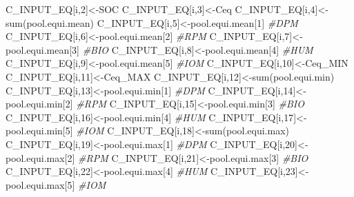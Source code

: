 \documentclass[
  10pt,
  b5paper,
]{book}
\newenvironment{Shaded}{\begin{snugshade}}{\end{snugshade}}
\newcommand{\CommentTok}[1]{\textcolor[rgb]{0.56,0.35,0.01}{\textit{#1}}}
\newcommand{\DecValTok}[1]{\textcolor[rgb]{0.00,0.00,0.81}{#1}}
\newcommand{\FunctionTok}[1]{\textcolor[rgb]{0.00,0.00,0.00}{#1}}
\newcommand{\NormalTok}[1]{#1}
\newcommand{\OtherTok}[1]{\textcolor[rgb]{0.56,0.35,0.01}{#1}}
\begin{document}
\begin{Shaded}
\begin{Highlighting}[]
\NormalTok{      C\_INPUT\_EQ[i,}\DecValTok{2}\NormalTok{]}\OtherTok{\textless{}{-}}\NormalTok{SOC}
\NormalTok{      C\_INPUT\_EQ[i,}\DecValTok{3}\NormalTok{]}\OtherTok{\textless{}{-}}\NormalTok{Ceq}
\NormalTok{      C\_INPUT\_EQ[i,}\DecValTok{4}\NormalTok{]}\OtherTok{\textless{}{-}}\FunctionTok{sum}\NormalTok{(pool.equi.mean)}
\NormalTok{      C\_INPUT\_EQ[i,}\DecValTok{5}\NormalTok{]}\OtherTok{\textless{}{-}}\NormalTok{pool.equi.mean[}\DecValTok{1}\NormalTok{] }\CommentTok{\#DPM}
\NormalTok{      C\_INPUT\_EQ[i,}\DecValTok{6}\NormalTok{]}\OtherTok{\textless{}{-}}\NormalTok{pool.equi.mean[}\DecValTok{2}\NormalTok{] }\CommentTok{\#RPM}
\NormalTok{      C\_INPUT\_EQ[i,}\DecValTok{7}\NormalTok{]}\OtherTok{\textless{}{-}}\NormalTok{pool.equi.mean[}\DecValTok{3}\NormalTok{] }\CommentTok{\#BIO}
\NormalTok{      C\_INPUT\_EQ[i,}\DecValTok{8}\NormalTok{]}\OtherTok{\textless{}{-}}\NormalTok{pool.equi.mean[}\DecValTok{4}\NormalTok{] }\CommentTok{\#HUM}
\NormalTok{      C\_INPUT\_EQ[i,}\DecValTok{9}\NormalTok{]}\OtherTok{\textless{}{-}}\NormalTok{pool.equi.mean[}\DecValTok{5}\NormalTok{] }\CommentTok{\#IOM}
\NormalTok{      C\_INPUT\_EQ[i,}\DecValTok{10}\NormalTok{]}\OtherTok{\textless{}{-}}\NormalTok{Ceq\_MIN}
\NormalTok{      C\_INPUT\_EQ[i,}\DecValTok{11}\NormalTok{]}\OtherTok{\textless{}{-}}\NormalTok{Ceq\_MAX}
\NormalTok{      C\_INPUT\_EQ[i,}\DecValTok{12}\NormalTok{]}\OtherTok{\textless{}{-}}\FunctionTok{sum}\NormalTok{(pool.equi.min)}
\NormalTok{      C\_INPUT\_EQ[i,}\DecValTok{13}\NormalTok{]}\OtherTok{\textless{}{-}}\NormalTok{pool.equi.min[}\DecValTok{1}\NormalTok{] }\CommentTok{\#DPM}
\NormalTok{      C\_INPUT\_EQ[i,}\DecValTok{14}\NormalTok{]}\OtherTok{\textless{}{-}}\NormalTok{pool.equi.min[}\DecValTok{2}\NormalTok{] }\CommentTok{\#RPM}
\NormalTok{      C\_INPUT\_EQ[i,}\DecValTok{15}\NormalTok{]}\OtherTok{\textless{}{-}}\NormalTok{pool.equi.min[}\DecValTok{3}\NormalTok{] }\CommentTok{\#BIO}
\NormalTok{      C\_INPUT\_EQ[i,}\DecValTok{16}\NormalTok{]}\OtherTok{\textless{}{-}}\NormalTok{pool.equi.min[}\DecValTok{4}\NormalTok{] }\CommentTok{\#HUM}
\NormalTok{      C\_INPUT\_EQ[i,}\DecValTok{17}\NormalTok{]}\OtherTok{\textless{}{-}}\NormalTok{pool.equi.min[}\DecValTok{5}\NormalTok{] }\CommentTok{\#IOM}
\NormalTok{      C\_INPUT\_EQ[i,}\DecValTok{18}\NormalTok{]}\OtherTok{\textless{}{-}}\FunctionTok{sum}\NormalTok{(pool.equi.max)}
\NormalTok{      C\_INPUT\_EQ[i,}\DecValTok{19}\NormalTok{]}\OtherTok{\textless{}{-}}\NormalTok{pool.equi.max[}\DecValTok{1}\NormalTok{] }\CommentTok{\#DPM }
\NormalTok{      C\_INPUT\_EQ[i,}\DecValTok{20}\NormalTok{]}\OtherTok{\textless{}{-}}\NormalTok{pool.equi.max[}\DecValTok{2}\NormalTok{] }\CommentTok{\#RPM }
\NormalTok{      C\_INPUT\_EQ[i,}\DecValTok{21}\NormalTok{]}\OtherTok{\textless{}{-}}\NormalTok{pool.equi.max[}\DecValTok{3}\NormalTok{] }\CommentTok{\#BIO }
\NormalTok{      C\_INPUT\_EQ[i,}\DecValTok{22}\NormalTok{]}\OtherTok{\textless{}{-}}\NormalTok{pool.equi.max[}\DecValTok{4}\NormalTok{] }\CommentTok{\#HUM }
\NormalTok{      C\_INPUT\_EQ[i,}\DecValTok{23}\NormalTok{]}\OtherTok{\textless{}{-}}\NormalTok{pool.equi.max[}\DecValTok{5}\NormalTok{] }\CommentTok{\#IOM }
    

\end{Highlighting}
\end{Shaded}
\end{document}
